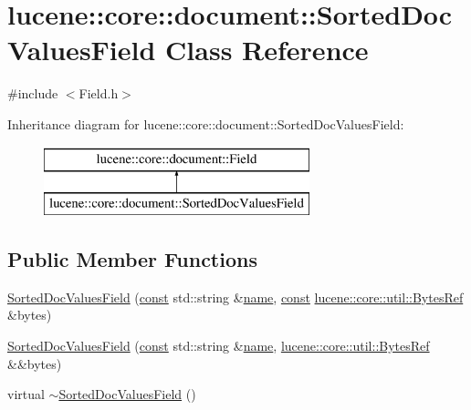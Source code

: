 \hypertarget{classlucene_1_1core_1_1document_1_1SortedDocValuesField}{}\section{lucene\+:\+:core\+:\+:document\+:\+:Sorted\+Doc\+Values\+Field Class Reference}
\label{classlucene_1_1core_1_1document_1_1SortedDocValuesField}


{\ttfamily \#include $<$Field.\+h$>$}

Inheritance diagram for lucene\+:\+:core\+:\+:document\+:\+:Sorted\+Doc\+Values\+Field\+:\begin{figure}[H]
\begin{center}
\leavevmode
\includegraphics[height=2.000000cm]{classlucene_1_1core_1_1document_1_1SortedDocValuesField}
\end{center}
\end{figure}
\subsection*{Public Member Functions}
\begin{DoxyCompactItemize}
\item 
\mbox{\hyperlink{classlucene_1_1core_1_1document_1_1SortedDocValuesField_ac719c5097e0d9280a600727b6832ed97}{Sorted\+Doc\+Values\+Field}} (\mbox{\hyperlink{ZlibCrc32_8h_a2c212835823e3c54a8ab6d95c652660e}{const}} std\+::string \&\mbox{\hyperlink{classlucene_1_1core_1_1document_1_1Field_a52f673f3b3abb14b180f5159f4726537}{name}}, \mbox{\hyperlink{ZlibCrc32_8h_a2c212835823e3c54a8ab6d95c652660e}{const}} \mbox{\hyperlink{classlucene_1_1core_1_1util_1_1BytesRef}{lucene\+::core\+::util\+::\+Bytes\+Ref}} \&bytes)
\item 
\mbox{\hyperlink{classlucene_1_1core_1_1document_1_1SortedDocValuesField_a8f1935bbacd77a69e967e28af37911c6}{Sorted\+Doc\+Values\+Field}} (\mbox{\hyperlink{ZlibCrc32_8h_a2c212835823e3c54a8ab6d95c652660e}{const}} std\+::string \&\mbox{\hyperlink{classlucene_1_1core_1_1document_1_1Field_a52f673f3b3abb14b180f5159f4726537}{name}}, \mbox{\hyperlink{classlucene_1_1core_1_1util_1_1BytesRef}{lucene\+::core\+::util\+::\+Bytes\+Ref}} \&\&bytes)
\item 
virtual \mbox{\hyperlink{classlucene_1_1core_1_1document_1_1SortedDocValuesField_a6a8a5b87dbd1c802d8a920e005da0332}{$\sim$\+Sorted\+Doc\+Values\+Field}} ()
\end{DoxyCompactItemize}
